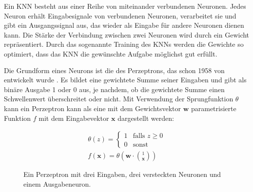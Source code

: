 Ein KNN besteht aus einer Reihe von miteinander verbundenen Neuronen.
Jedes Neuron erhält Eingabesignale von verbundenen Neuronen, verarbeitet sie und gibt ein Ausgangssignal aus, das wieder als Eingabe für andere Neuronen dienen kann.
Die Stärke der Verbindung zwischen zwei Neuronen wird durch ein Gewicht repräsentiert.
Durch das sogenannte Training des KNNs werden die Gewichte so optimiert, dass das KNN die gewünschte Aufgabe möglichst gut erfüllt.

Die Grundform eines Neurons ist die des Perzeptrons, das schon 1958 von  entwickelt wurde \cite{Rosenblatt1958}.
Es bildet eine gewichtete Summe seiner Eingaben und gibt als binäre Ausgabe 1 oder 0 aus, je nachdem, ob die gewichtete Summe einen Schwellenwert überschreitet oder nicht.
Mit Verwendung der Sprungfunktion $\theta$ kann ein Perzeptron kann als eine mit dem Gewichtsvektor $\mathbf{w}$ parametrisierte Funktion $f$ mit dem Eingabevektor $\mathbf{x}$ dargestellt werden:

$$
\begin{aligned}
    \theta (z) = \begin{cases} 1 & \text{falls } z \geq 0 \\ 0 & \text{sonst} \end{cases}
\\
f(\mathbf{x}) = \theta \left(\mathbf{w} \cdot \binom{1}{\mathbf{x}} \right)
\end{aligned}
$$

\begin{figure}
    \centering
    \caption{Ein Perzeptron mit drei Eingaben, drei versteckten Neuronen und einem Ausgabeneuron.}
    \label{fig:perzeptron}
\end{figure}

